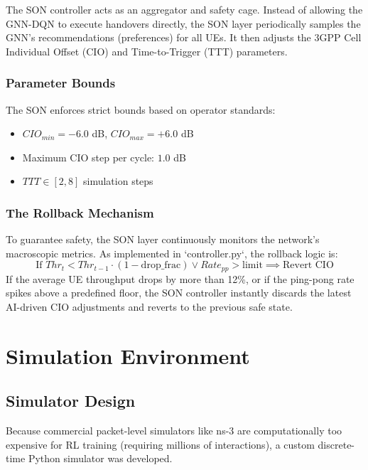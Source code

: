 \documentclass[12pt,a4paper,oneside]{report}
\begin{document}
The SON controller acts as an aggregator and safety cage. Instead of allowing the GNN-DQN to execute handovers directly, the SON layer periodically samples the GNN's recommendations (preferences) for all UEs. It then adjusts the 3GPP Cell Individual Offset (CIO) and Time-to-Trigger (TTT) parameters.

\subsection{Parameter Bounds}
The SON enforces strict bounds based on operator standards:
\begin{itemize}
    \item $CIO_{min} = -6.0$ dB, $CIO_{max} = +6.0$ dB
    \item Maximum CIO step per cycle: $1.0$ dB
    \item $TTT \in [2, 8]$ simulation steps
\end{itemize}

\subsection{The Rollback Mechanism}
To guarantee safety, the SON layer continuously monitors the network's macroscopic metrics. As implemented in `controller.py`, the rollback logic is:
\begin{equation}
    \text{If } Thr_{t} < Thr_{t-1} \cdot (1 - \text{drop\_frac}) \lor Rate_{pp} > \text{limit} \implies \text{Revert CIO}
\end{equation}
If the average UE throughput drops by more than 12\%, or if the ping-pong rate spikes above a predefined floor, the SON controller instantly discards the latest AI-driven CIO adjustments and reverts to the previous safe state.

\chapter{Simulation Environment}
\label{ch:sim}

\section{Simulator Design}
Because commercial packet-level simulators like ns-3 are computationally too expensive for RL training (requiring millions of interactions), a custom discrete-time Python simulator was developed.
\end{document}
